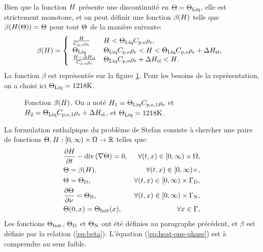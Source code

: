Bien que la fonction $H$ présente une discontinuité en
$\Theta = \Theta_\text{Liq}$, elle est strictement monotone, et on peut
définir une fonction $\beta(H)$ telle que
$\beta(H(\Theta)) = \Theta$ pour tout
$\Theta$ de la manière suivante:
\begin{equation}\label{eq:beta}
  \beta(\enthalpy) = \left\{
  \begin{array}{ll}
    \frac{\enthalpy}{\electrolytehc\electrolytedensity} %
      & \enthalpy < \tliq \electrolytehc\electrolytedensity,\\
    \tliq %
      & \tliq \electrolytehc\electrolytedensity < \enthalpy < \tliq \electrolytehc\electrolytedensity + \fusionenthalpy,\\
    \frac{\enthalpy - \fusionenthalpy}{\electrolytehc\electrolytedensity} %
      & \tliq\electrolytehc\electrolytedensity + \fusionenthalpy < \enthalpy.\\
  \end{array}
  \right.
\end{equation}
La fonction $\beta$ est représentée sur la figure \ref{fig:beta}. Pour
les besoins de la représentation, on a choisi ici $\Theta_\text{Liq} = 1218\si{\kelvin}$.
\begin{figure}
  \begin{center}
    
    \caption{Fonction $\beta(H)$. On a noté $H_1 =
      \Theta_\text{Liq}C_{\mathrm{p,e,1}}\rho_\mathrm{e}$ et $H_2 =
      \Theta_\text{Liq}C_{\mathrm{p,e,1}}\rho_\mathrm{e} + \Delta H_\mathrm{sl}$, et
      $\Theta_\text{Liq} = 1218\si{\kelvin}$.}
    \label{fig:beta}
  \end{center}
\end{figure}

La formulation enthalpique du problème de Stefan consiste à chercher
une paire de fonctions
$\Theta,H:[0,\infty)\times\Omega\to\mathbb R$
telles que:
\begin{align}
  & \frac{\partial \enthalpydensity}{\partial t} %
  - \div\parent{ \nabla \temperature} = 0,%
  & \forall (t, x) \in [0,\infty)\times
    \Omega,\label{eq:heat-one-phase}\\
  & \temperature = \beta(\enthalpydensity),
    &\forall (t, x) \in [0,\infty)\times,\label{eq:heat-temperature-enthalpy}\\
  & \temperature = \temperature_\mathrm{D}, %
  & \forall (t, x) \in [0,\infty)\times \Gamma_\mathrm{D},\label{eq:heat-one-phase-dirichlet}\\
  & \frac{\partial \temperature}{\partial \nu} = \temperature_\mathrm{N}, %
  & \forall (t, x) \in [0,\infty)\times \Gamma_\mathrm{N},\label{eq:heat-one-phase-neumann}\\
  & \temperature(0, x) = \tinit(x),
  & \forall x\in\Gamma,\label{eq:heat-initial-condition}
\end{align}
Les fonctions $\Theta_\text{Init}$, $\Theta_\mathrm{D}$ et
$\Theta_\mathrm{N}$ ont été définies au paragraphe précédent, et
$\beta$ est définie par la relation (\ref{eq:beta}). L'équation
(\ref{eq:heat-one-phase}) est à comprendre au sens faible.

